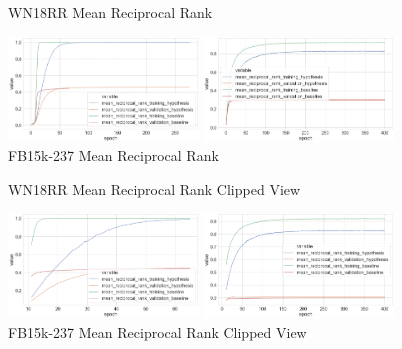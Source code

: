 \begin{figure}[H]
	\parbox{.5\linewidth}{
   		\caption{WN18RR Mean Reciprocal Rank}
   		\centering
    		\includegraphics[width=0.45\textwidth, height=0.2\textheight]{WN18RR_mean_reciprocal_rank_Results}
		}
	\hfill
	\parbox{.5\linewidth}{
		\caption{FB15k-237 Mean Reciprocal Rank}
   		\centering
		\includegraphics[width=0.45\textwidth, height=0.2\textheight]{FB15k-237_mean_reciprocal_rank_Results}
		}
\end{figure}

\begin{figure}[H]
	\parbox{.5\linewidth}{
   		\caption{WN18RR Mean Reciprocal Rank Clipped View}
   		\centering
    		\includegraphics[width=0.45\textwidth, height=0.2\textheight]{WN18RR_mean_reciprocal_rank_Results_Clipped}
		}
	\hfill
	\parbox{.5\linewidth}{
		\caption{FB15k-237 Mean Reciprocal Rank Clipped View}
   		\centering
		\includegraphics[width=0.45\textwidth, height=0.2\textheight]{FB15k-237_mean_reciprocal_rank_Results_Clipped}
		}
\end{figure}


